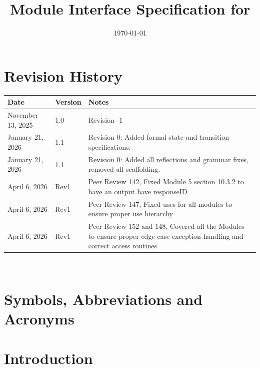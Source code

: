 \documentclass[12pt, titlepage]{article}
\begin{document}
\title{Module Interface Specification for \progname{}}

\author{\authname}

\date{\today}

\maketitle


\section{Revision History}

\begin{tabularx}{\textwidth}{p{3cm}p{2cm}X}
\toprule {\bf Date} & {\bf Version} & {\bf Notes}\\
\midrule
November 13, 2025 & 1.0 & Revision -1\\
January 21, 2026 & 1.1 & Revision 0: Added formal state and transition specifications.\\
January 21, 2026 & 1.1 & Revision 0: Added all reflections and grammar fixes, removed all scaffolding.\\
April 6, 2026 & Rev1& Peer Review 142, Fixed Module 5 section 10.3.2 to have an output have responseID\\
April 6, 2026 & Rev1& Peer Review 147, Fixed uses for all modules to ensure proper use hierarchy\\
April 6, 2026 & Rev1& Peer Review 152 and 148, Covered all the Modules to ensure proper edge case exception handling and correct access routines\\
\bottomrule
\end{tabularx}

~\newpage

\section{Symbols, Abbreviations and Acronyms}

\glsaddall
\printnoidxglossaries


\newpage

\tableofcontents

\newpage


\section{Introduction}
\end{document}

